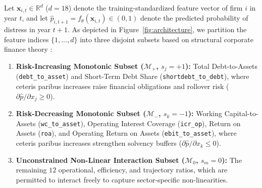 \documentclass[pdflatex,sn-mathphys-num,twocolumn]{sn-jnl}
\theoremstyle{thmstyleone}
\theoremstyle{thmstyletwo}
\theoremstyle{thmstylethree}
\begin{document}
Let $\mathbf{x}_{i,t} \in \mathbb{R}^d$ ($d=18$) denote the training-standardized feature vector of firm $i$ in year $t$, and let $\hat{p}_{i,t+1} = f_\theta(\mathbf{x}_{i,t}) \in (0,1)$ denote the predicted probability of distress in year $t+1$. As depicted in Figure~\ref{fig:architecture}, we partition the feature indices $\{1,\dots,d\}$ into three disjoint subsets based on structural corporate finance theory \citep{merton1974pricing,altman1968financial}:
\begin{enumerate}
    \item \textbf{Risk-Increasing Monotonic Subset ($\mathcal{M}_+$, $s_j = +1$):} Total Debt-to-Assets (\texttt{debt\_to\_asset}) and Short-Term Debt Share (\texttt{shortdebt\_to\_debt}), where ceteris paribus increases raise financial obligations and rollover risk ($\partial \hat{p} / \partial x_j \ge 0$).
    \item \textbf{Risk-Decreasing Monotonic Subset ($\mathcal{M}_-$, $s_k = -1$):} Working Capital-to-Assets (\texttt{wc\_to\_asset}), Operating Interest Coverage (\texttt{icr\_op}), Return on Assets (\texttt{roa}), and Operating Return on Assets (\texttt{ebit\_to\_asset}), where ceteris paribus increases strengthen solvency buffers ($\partial \hat{p} / \partial x_k \le 0$).
    \item \textbf{Unconstrained Non-Linear Interaction Subset ($\mathcal{M}_0$, $s_m = 0$):} The remaining $12$ operational, efficiency, and trajectory ratios, which are permitted to interact freely to capture sector-specific non-linearities.
\end{enumerate}
\end{document}
